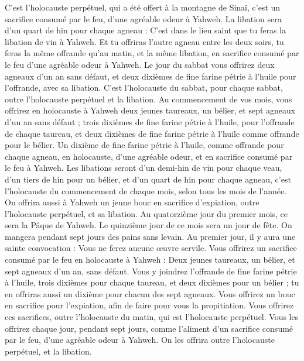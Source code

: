 \begin{multicols}{2}
C'est l'holocauste perpétuel, qui a été offert à la montagne de Sinaï, c'est un sacrifice consumé par le feu, d'une agréable odeur à Yahweh.
La libation sera d'un quart de hin pour chaque agneau : C'est dans le lieu saint que tu feras la libation de vin à Yahweh.
Et tu offriras l'autre agneau entre les deux soirs, tu feras la même offrande qu'au matin, et la même libation, en sacrifice consumé par le feu d'une agréable odeur à Yahweh.
Le jour du sabbat vous offrirez deux agneaux d'un an sans défaut, et deux dixièmes de fine farine pétrie à l'huile pour l'offrande, avec sa libation.
C'est l'holocauste du sabbat, pour chaque sabbat, outre l'holocauste perpétuel et la libation.
Au commencement de vos mois, vous offrirez en holocauste à Yahweh deux jeunes taureaux, un bélier, et sept agneaux d'un an sans défaut ;
trois dixièmes de fine farine pétrie à l'huile, pour l'offrande de chaque taureau, et deux dixièmes de fine farine pétrie à l'huile comme offrande pour le bélier.
Un dixième de fine farine pétrie à l'huile, comme offrande pour chaque agneau, en holocauste, d'une agréable odeur, et en sacrifice consumé par le feu à Yahweh.
Les libations seront d'un demi-hin de vin pour chaque veau, d'un tiers de hin pour un bélier, et d'un quart de hin pour chaque agneau, c'est l'holocauste du commencement de chaque mois, selon tous les mois de l'année.
On offrira aussi à Yahweh un jeune bouc en sacrifice d'expiation, outre l'holocauste perpétuel, et sa libation.
Au quatorzième jour du premier mois, ce sera la Pâque de Yahweh.
Le quinzième jour de ce mois sera un jour de fête. On mangera pendant sept jours des pains sans levain.
Au premier jour, il y aura une sainte convocation : Vous ne ferez aucune œuvre servile.
Vous offrirez un sacrifice consumé par le feu en holocauste à Yahweh : Deux jeunes taureaux, un bélier, et sept agneaux d'un an, sans défaut.
Vous y joindrez l'offrande de fine farine pétrie à l'huile, trois dixièmes pour chaque taureau, et deux dixièmes pour un bélier ;
tu en offriras aussi un dixième pour chacun des sept agneaux.
Vous offrirez un bouc en sacrifice pour l'expiation, afin de faire pour vous la propitiation.
Vous offrirez ces sacrifices, outre l'holocauste du matin, qui est l'holocauste perpétuel.
Vous les offrirez chaque jour, pendant sept jours, comme l'aliment d'un sacrifice consumé par le feu, d'une agréable odeur à Yahweh. On les offrira outre l'holocauste perpétuel, et la libation.

\end{multicols}
